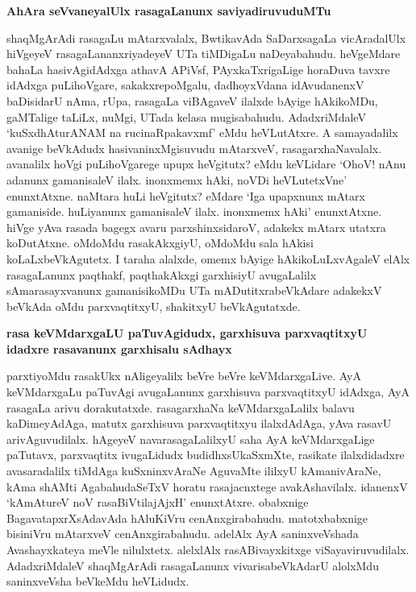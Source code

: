 {\bigskip
\noindent
{\large\bf AhAra seVvaneyalUlx rasagaLanunx saviyadiruvuduMTu}}\label{page221}
\medskip

\noindent
shaqMgArAdi rasagaLu mAtarxvalalx, BwtikavAda SaDarxsagaLa vicAradalUlx hiVgeyeV rasagaLananxriyade\-yeV UTa tiMDigaLu naDeyabahudu. heVgeMdare bahaLa hasi\-vAgidAdxga athavA APiVsf, PAyxkaTxrigaLige hora\-Duva tavxre idAdxga puLihoVgare, sakakxrepoMgalu, dadhoyxVdana idAvudanenxV baDisidarU nAma, rUpa, rasa\-gaLa viBAgaveV ilalxde bAyige hAkikoMDu, gaMTalige taLiLx, nuMgi, UTada kelasa mugisa\-bahudu. AdadxriMdaleV `kuSxdhAturANAM na rucinaRpakavxmf'\label{221} eMdu heVLu\-tAtxre. A samayadalilx avanige beVkAdudx hasivaninxMgisuvudu mAtarxveV, rasa\-garxhaNavalalx. avanalilx hoVgi puLihoVgarege upupx heVgitutx? eMdu keVLidare `OhoV! nAnu adanunx gamanisaleV ilalx. inonxmemx hAki, noVDi heVLutetxVne' enunx\-tAtxne. naMtara huLi heVgitutx? eMdare `Iga upapxnunx mAtarx gamaniside. huLiyanunx gamanisaleV ilalx. inonxmemx hAki' enunxtAtxne. hiVge yAva rasada bagegx avaru parxshinxsidaroV, adakekx mAtarx utatxra koDu\-tAtxne. oMdoMdu rasakAkxgiyU, oMdoMdu sala hAkisi koLaLxbeVkAgutetx. I taraha alalxde, omemx bAyige hAkikoLuLxvAgaleV elAlx rasagaLanunx paqthakf, paqthakAkxgi garxhisiyU avugaLalilx sAmarasayxvanunx gamanisikoMDu UTa mADutitxrabeVkAdare adakekxV beVkAda oMdu parxvaqtitxyU, shakitxyU beVkAgutatxde.

{\bigskip
\noindent
{\large\bf rasa keVMdarxgaLU paTuvAgidudx, garxhisuva parxvaqtitxyU idadxre rasavanunx garxhisalu sAdhayx}}\label{page222}
\medskip

\noindent
parxtiyoMdu rasakUkx nAligeyalilx beVre beVre keVMdarxgaLive. AyA keVMdarxgaLu paTuvAgi avu\-gaLanunx garxhisuva parxvaqtitxyU idAdxga, AyA rasagaLa arivu dora\-kutatxde. rasagarxhaNa keVMdarxgaLalilx balavu kaDimeyAdAga, matutx garxhisuva parxvaqtitxyu ilalxdAdAga, yAva rasavU arivAguvudilalx. hAgeyeV navarasagaLalilxyU saha AyA keVMdarxgaLige paTutavx, parxvaqtitx ivugaLidudx budidhxsUkaSxmXte, rasikate ilalx\-didadxre avasaradalilx tiMdAga kuSxninxvAraNe AguvaMte ililxyU kAmanivAraNe, kAma shAMti Agabahu\-daSeTxV horatu rasajacnxtege avakAshavilalx. idanenxV `kAmAtureV noV rasaBiVtilajAjxH'\label{222} enunxtAtxre. obabxnige BagavatapxrXsAdavAda hAluKiVru cenAnxgirabahudu. matotxbabxnige bisiniVru mAtarxveV cenAnxgira\-bahudu. adelAlx AyA saninxveVshada Avashayxkateya meVle nilulxtetx. alelxlAlx rasABivayxkitxge viSayaviruvudilalx. Adadx\-riMdaleV shaqMgArAdi rasagaLanunx vivarisabeVkAdarU alolxMdu saninxveVsha beVkeMdu heVLidudx.

